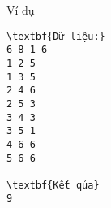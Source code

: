 Ví dụ
\begin{verbatim}
\textbf{Dữ liệu:}
6 8 1 6
1 2 5
1 3 5
2 4 6
2 5 3
3 4 3
3 5 1
4 6 6
5 6 6

\textbf{Kết qủa}
9
\end{verbatim}